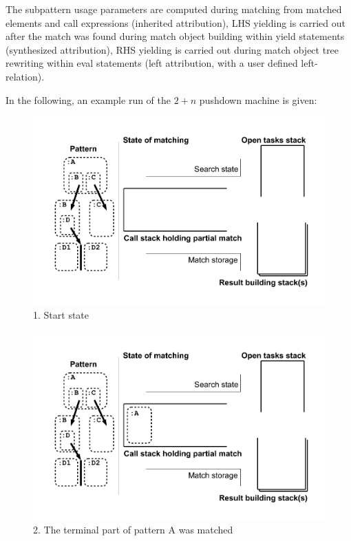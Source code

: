The subpattern usage parameters are computed during matching from matched elements and call expressions (inherited attribution), LHS yielding is carried out after the match was found during match object building within yield statements (synthesized attribution), RHS yielding is carried out during match object tree rewriting within eval statements (left attribution, with a user defined left-relation).

In the following, an example run of the $2+n$ pushdown machine is given:

\vspace{2cm} %

\begin{figure}[htbp]
  \centering
  \includegraphics[width=\textwidth]{fig/Passungszustand1}
  \caption{1. Start state}
  \label{figmatchingstate1}
\end{figure}

\begin{figure}[htbp]
  \centering
  \includegraphics[width=\textwidth]{fig/Passungszustand2}
  \caption{2. The terminal part of pattern A was matched}
  \label{figmatchingstate2}
\end{figure}

